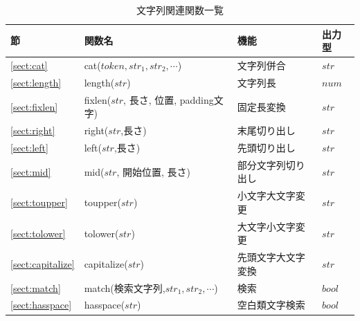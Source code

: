 \begin{table}[!hb]
\begin{center}
\caption{文字列関連関数一覧\label{tbl:mcal_char}}
{\small
  \begin{tabular}{l|l|l|l} \hline
節&関数名&機能&出力型\\ \hline

\ref{sect:cat}& cat($token, str_1, str_2, \cdots$)&
文字列併合&
$str$\\

\ref{sect:length}& length($str$)&
文字列長&
$num$\\


\ref{sect:fixlen}& fixlen($str$, 長さ, 位置, padding文字)&
固定長変換&
$str$\\


\ref{sect:right}& right($str$,長さ)&
末尾切り出し&
$str$\\
\ref{sect:left}& left($str$,長さ)&
先頭切り出し&
$str$\\
\ref{sect:mid}& mid($str$, 開始位置, 長さ)&
部分文字列切り出し &
$str$\\
\ref{sect:toupper}& toupper($str$)&
小文字大文字変更&
$str$\\
\ref{sect:tolower}& tolower($str$)&
大文字小文字変更&
$str$\\
\ref{sect:capitalize}& capitalize($str$)&
先頭文字大文字変換&
$str$\\
\ref{sect:match}& match(検索文字列,$str_1,str_2,\cdots$)&
検索&
$bool$\\


\ref{sect:hasspace}& hasspace($str$)&
空白類文字検索&
$bool$\\

\hline
  \end{tabular}
  }
  \end{center}
\end{table}

